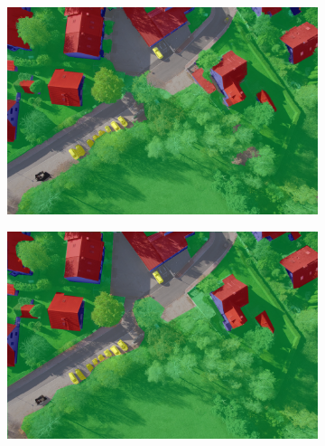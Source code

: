 \begin{figure}[htb]
\begin{subfigure}{0.49\columnwidth}
  \centering
  \includegraphics[width=1\linewidth]{fig/overlay/DSC00847_auto_lay.png}
  \label{fig:sfig1}
\end{subfigure}\hfill
\vspace{-0.35\baselineskip}
\begin{subfigure}{0.49\columnwidth}
  \centering
  \includegraphics[width=1\linewidth]{fig/overlay/DSC00847_manual_lay.png}
  \label{fig:sfig1}
\end{subfigure}
\vspace{-0.35\baselineskip}


\end{figure}
